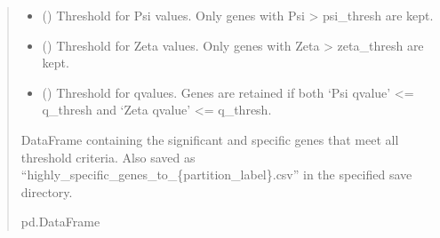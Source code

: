 \documentclass[letterpaper,10pt,english]{sphinxmanual}
\begin{document}
\begin{fulllineitems}
\begin{quote}
\begin{description}
\begin{itemize}
\item {} 
\sphinxAtStartPar
{} (\sphinxstyleliteralemphasis{\sphinxupquote{, }}) \textendash{} Threshold for Psi values. Only genes with Psi \textgreater{} psi\_thresh are kept.

\item {} 
\sphinxAtStartPar
{} (\sphinxstyleliteralemphasis{\sphinxupquote{, }}\sphinxstyleliteralemphasis{\sphinxupquote{, }}) \textendash{} Threshold for Zeta values. Only genes with Zeta \textgreater{} zeta\_thresh are kept.

\item {} 
\sphinxAtStartPar
{} (\sphinxstyleliteralemphasis{\sphinxupquote{, }}) \textendash{} Threshold for q\sphinxhyphen{}values. Genes are retained if both
‘Psi q\sphinxhyphen{}value’ \textless{}= q\_thresh and ‘Zeta q\sphinxhyphen{}value’ \textless{}= q\_thresh.

\end{itemize}

\sphinxAtStartPar
DataFrame containing the significant and specific genes that meet
all threshold criteria. Also saved as “highly\_specific\_genes\_to\_\{partition\_label\}.csv”
in the specified save directory.

\sphinxAtStartPar
pd.DataFrame

\end{description}\end{quote}

\end{fulllineitems}

\end{document}
